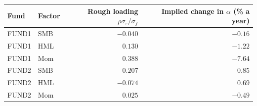 \begin{tabular}{llrr}
\toprule
Fund & Factor & Rough loading $\rho\sigma_\varepsilon/\sigma_f$ & Implied change in $\alpha$ (\% a year) \\
\midrule
FUND1 & SMB & $-0.040$ & $-0.16$ \\
FUND1 & HML & $0.130$ & $-1.22$ \\
FUND1 & Mom & $0.388$ & $-7.64$ \\
FUND2 & SMB & $0.207$ & $0.85$ \\
FUND2 & HML & $-0.074$ & $0.69$ \\
FUND2 & Mom & $0.025$ & $-0.49$ \\
\bottomrule
\end{tabular}
